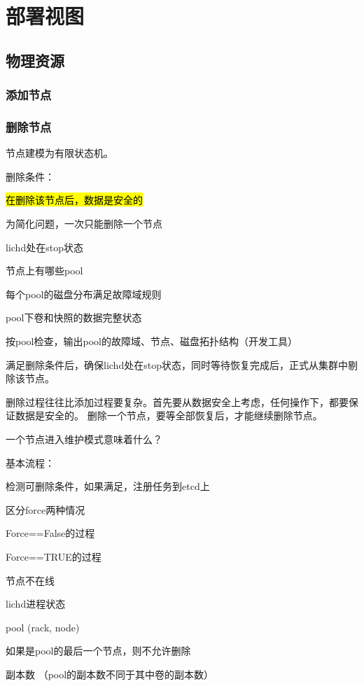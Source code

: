 \chapter{部署视图}

\section{物理资源}

\subsection{添加节点}

\subsection{删除节点}

节点建模为有限状态机。

删除条件：
\begin{enumbox}
\item \hl{在删除该节点后，数据是安全的}
\item 为简化问题，一次只能删除一个节点
\item lichd处在stop状态
\item 节点上有哪些pool
\item 每个pool的磁盘分布满足故障域规则
\item pool下卷和快照的数据完整状态
\end{enumbox}

按pool检查，输出pool的故障域、节点、磁盘拓扑结构（开发工具）

满足删除条件后，确保lichd处在stop状态，同时等待恢复完成后，正式从集群中剔除该节点。

删除过程往往比添加过程要复杂。首先要从数据安全上考虑，任何操作下，都要保证数据是安全的。
删除一个节点，要等全部恢复后，才能继续删除节点。

一个节点进入维护模式意味着什么？

基本流程：
\begin{enumbox}
\item 检测可删除条件，如果满足，注册任务到etcd上
\item 区分force两种情况
\item Force==False的过程
\item Force==TRUE的过程
\item *
\item 节点不在线
\item lichd进程状态
\item pool (rack, node)
\item 如果是pool的最后一个节点，则不允许删除
\item 副本数 （pool的副本数不同于其中卷的副本数）
\end{enumbox}

